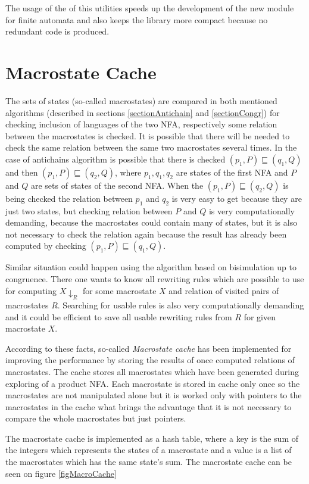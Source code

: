 The usage of the of this utilities speeds up the development of the new module for finite automata and also keeps the library more compact because no
redundant code is produced.

\section{Macrostate Cache}
\label{sectionCache}
The sets of states (so-called macrostates) are compared in both mentioned algorithms (described in sections \ref{sectionAntichain} and \ref{sectionCongr}) 
for checking inclusion of languages of the two NFA, 
respectively some relation between the macrostates is checked. It is possible that there will be needed to check the same relation between the same
two macrostates several times. In the case of antichains algorithm is possible that there is checked $(p_1,P) \sqsubseteq (q_1,Q)$ and then $(p_1,P)\sqsubseteq
(q_2,Q)$, where $p_1,q_1,q_2$ are states of the first NFA and $P$ and $Q$ are sets of states of the second NFA. 
When the $(p_1,P)\sqsubseteq(q_2,Q)$ is being checked the relation between $p_1$ and $q_2$ is very easy to get because they are just two states, but checking
relation between $P$ and $Q$ is very computationally demanding, because the macrostates could contain many of states, but it is also not necessary to
check the relation again because the result has already been computed by checking $(p_1,P) \sqsubseteq (q_1,Q)$. 

Similar situation could happen using the algorithm based on bisimulation up to congruence. There one wants to know all rewriting rules which are possible to use
for computing $X{\downarrow_R}$ for some macrostate $X$ and relation of visited pairs of macrostates $R$. Searching for usable rules is also very computationally
demanding and it could be efficient to save all usable rewriting rules from $R$ for given macrostate $X$.

According to these facts, so-called \emph{Macrostate cache} has been implemented for improving the performance by storing the results of 
once computed relations of macrostates. The cache stores all macrostates which have been generated during exploring of a product NFA. Each macrostate is 
stored in cache only once so the macrostates are not manipulated alone  
but it is worked only with pointers to the macrostates in the cache what brings the advantage that it is not 
necessary to compare the whole macrostates but just pointers.

The macrostate cache is implemented as a hash table, where a key is the sum of the integers which represents the states of a macrostate and a value is a
list of the macrostates which has the same state's sum. The macrostate cache can be seen on figure \ref{figMacroCache}

